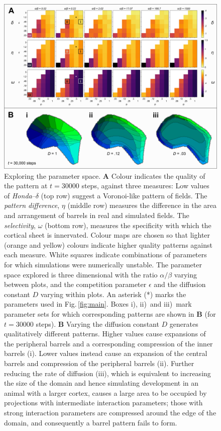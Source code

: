 \documentclass[9pt,lineno]{elife}
\newcommand{\MPthreePar}[1]{\textcolor{colmpthreepar}{#1}}
\begin{document}
\begin{figure}
  \begin{fullwidth}
    \includegraphics[width=\linewidth]{./Fig2.png}
    \caption{\MPthreePar{Exploring the parameter space.
        \textbf{A} Colour indicates the quality of the pattern at $t=30000$
        steps, against three measures: Low values of \emph{Honda}--$\delta$
        (top row) suggest a Voronoi-like pattern of fields. The \emph{pattern
          difference}, $\eta$ (middle row) measures the difference in the area
        and arrangement of barrels in real and simulated fields. The
        \emph{selectivity}, $\omega$ (bottom row), measures the specificity
        with which the cortical sheet is innervated. Colour maps are chosen so
        that lighter (orange and yellow) colours indicate higher quality
        patterns against each measure. White squares indicate combinations of
        parameters for which simulations were numerically unstable.
        The parameter space explored is three dimensional with the ratio
        $\alpha/\beta$ varying between plots, and the competition parameter
        $\epsilon$ and the diffusion constant $D$ varying within plots. An
        asterisk (*) marks the parameters used in Fig.\,\ref{fig:main}. Boxes
        i), ii)~and iii)~mark parameter sets for which corresponding patterns
        are shown in \textbf{B} (for $t=30000$ steps).
        \textbf{B} Varying the diffusion constant $D$ generates qualitatively
        different patterns. Higher values cause expansions of the peripheral
        barrels and a corresponding compression of the inner barrels
        (i). Lower values instead cause an expansion of the central barrels
        and compression of the peripheral barrels (ii). Further reducing the
        rate of diffusion (iii), which is equivalent to increasing the size of
        the domain and hence simulating development in an animal with a larger
        cortex, causes a large area to be occupied by projections with
        intermediate interaction parameters; those with strong interaction
        parameters are compressed around the edge of the domain, and
        consequently a barrel pattern fails to form.}}
    \label{fig:paramsweep}
  \end{fullwidth}
\end{figure}
\end{document}
